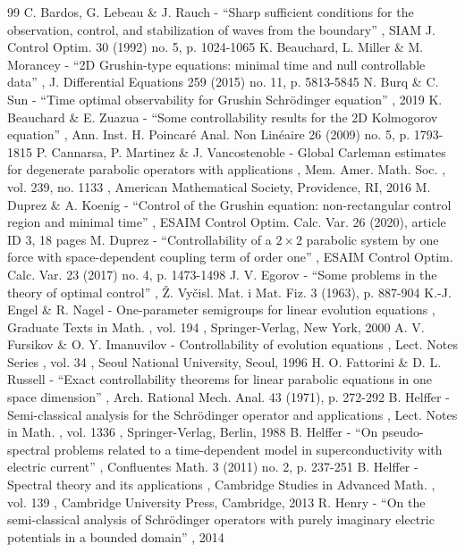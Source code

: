 \documentclass[11pt]{article}
\numberwithin{equation}{section}
\begin{document}
\begin{thebibliography}{99}
 C. Bardos, G. Lebeau \& J. Rauch - “Sharp sufficient conditions for the observation, control, and stabilization of waves from the boundary” , SIAM J. Control Optim. 30 (1992) no. 5, p. 1024-1065
 K. Beauchard, L. Miller \& M. Morancey - “2D Grushin-type equations: minimal time and null controllable data” , J. Differential Equations 259 (2015) no. 11, p. 5813-5845
 N. Burq \& C. Sun - “Time optimal observability for Grushin Schrödinger equation” , 2019
 K. Beauchard \& E. Zuazua - “Some controllability results for the 2D Kolmogorov equation” , Ann. Inst. H. Poincaré Anal. Non Linéaire 26 (2009) no. 5, p. 1793-1815
 P. Cannarsa, P. Martinez \& J. Vancostenoble - Global Carleman estimates for degenerate parabolic operators with applications , Mem. Amer. Math. Soc. , vol. 239, no. 1133 , American Mathematical Society, Providence, RI, 2016
 M. Duprez \& A. Koenig - “Control of the Grushin equation: non-rectangular control region and minimal time” , ESAIM Control Optim. Calc. Var. 26 (2020), article ID 3, 18 pages
 M. Duprez - “Controllability of a $2\times 2$ parabolic system by one force with space-dependent coupling term of order one” , ESAIM Control Optim. Calc. Var. 23 (2017) no. 4, p. 1473-1498
 J. V. Egorov - “Some problems in the theory of optimal control” , Ž. Vyčisl. Mat. i Mat. Fiz. 3 (1963), p. 887-904
 K.-J. Engel \& R. Nagel - One-parameter semigroups for linear evolution equations , Graduate Texts in Math. , vol. 194 , Springer-Verlag, New York, 2000
 A. V. Fursikov \& O. Y. Imanuvilov - Controllability of evolution equations , Lect. Notes Series , vol. 34 , Seoul National University, Seoul, 1996
 H. O. Fattorini \& D. L. Russell - “Exact controllability theorems for linear parabolic equations in one space dimension” , Arch. Rational Mech. Anal. 43 (1971), p. 272-292
 B. Helffer - Semi-classical analysis for the Schrödinger operator and applications , Lect. Notes in Math. , vol. 1336 , Springer-Verlag, Berlin, 1988
 B. Helffer - “On pseudo-spectral problems related to a time-dependent model in superconductivity with electric current” , Confluentes Math. 3 (2011) no. 2, p. 237-251
 B. Helffer - Spectral theory and its applications , Cambridge Studies in Advanced Math. , vol. 139 , Cambridge University Press, Cambridge, 2013
 R. Henry - “On the semi-classical analysis of Schrödinger operators with purely imaginary electric potentials in a bounded domain” , 2014

\end{thebibliography}
\end{document}
